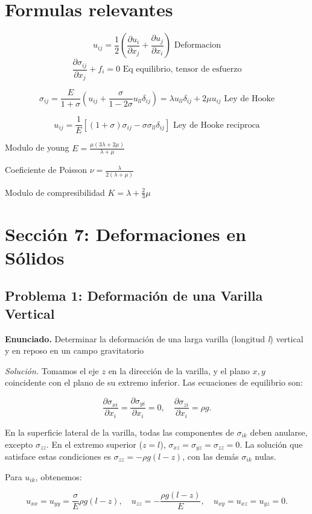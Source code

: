 \documentclass{article}
\begin{document}
\section*{Formulas relevantes}
$$ u_{ij} = \frac{1}{2}\left(\frac{\partial u_i}{\partial x_j} + \frac{\partial u_j}{\partial x_i}\right) \text{ Deformacion} $$
$$ \frac{\partial \sigma_{ij}}{\partial x_j}+f_i =0 \text{ Eq equilibrio, tensor de esfuerzo} $$

$$ \sigma_{ij} = \frac{E}{1+\sigma}(u_{ij}+\frac{\sigma}{1-2\sigma}u_{ll}\delta_{ij}) = \lambda u_{ll} \delta_{ij} + 2\mu u_{ij} \text{ Ley de Hooke}$$

$$ u_{ij} = \frac{1}{E}[(1+\sigma)\sigma_{ij} - \sigma \sigma_{ll}\delta_{ij}] \text{ Ley de Hooke reciproca}$$

Modulo de young $E = \frac{\mu (3\lambda+2\mu)}{\lambda + \mu} $

Coeficiente de Poisson $\nu = \frac{\lambda}{2(\lambda + \mu)} $

Modulo de compresibilidad $K = \lambda + \frac{2}{3}\mu $

\section*{Sección 7: Deformaciones en Sólidos}

\subsection*{Problema 1: Deformación de una Varilla Vertical}
\textbf{Enunciado.} Determinar la deformación de una larga varilla (longitud \textit{l}) vertical y en reposo en un campo gravitatorio

\textit{Solución.} Tomamos el eje $z$ en la dirección de la varilla, y el plano $x, y$ coincidente con el plano de su extremo inferior. Las ecuaciones de equilibrio son:

$$
\frac{\partial \sigma_{xi}}{\partial x_{i}} = \frac{\partial \sigma_{yi}}{\partial x_{i}} = 0, \quad \frac{\partial \sigma_{zi}}{\partial x_{i}} = \rho g.
$$

En la superficie lateral de la varilla, todas las componentes de $\sigma_{ik}$ deben anularse, excepto $\sigma_{zz}$. En el extremo superior ($z = l$), $\sigma_{xz} = \sigma_{yz} = \sigma_{zz} = 0$. La solución que satisface estas condiciones es $\sigma_{zz} = -\rho g(l - z)$, con las demás $\sigma_{ik}$ nulas.

Para $u_{ik}$, obtenemos:

$$
u_{xx} = u_{yy} = \frac{\sigma}{E}\rho g(l - z), \quad u_{zz} = -\frac{\rho g(l - z)}{E}, \quad u_{xy} = u_{xz} = u_{yz} = 0.
$$
\end{document}
